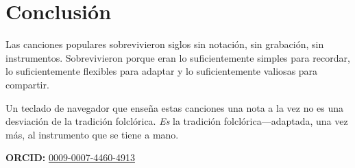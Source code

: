 \documentclass[11pt]{article}
\begin{document}
\section{Conclusión}

Las canciones populares sobrevivieron siglos sin notación, sin grabación, sin instrumentos. Sobrevivieron porque eran lo suficientemente simples para recordar, lo suficientemente flexibles para adaptar y lo suficientemente valiosas para compartir.

Un teclado de navegador que enseña estas canciones una nota a la vez no es una desviación de la tradición folclórica. \emph{Es} la tradición folclórica---adaptada, una vez más, al instrumento que se tiene a mano.

\vspace{0.5em}
\noindent\textbf{ORCID:} \href{https://orcid.org/0009-0007-4460-4913}{0009-0007-4460-4913}



\end{document}
